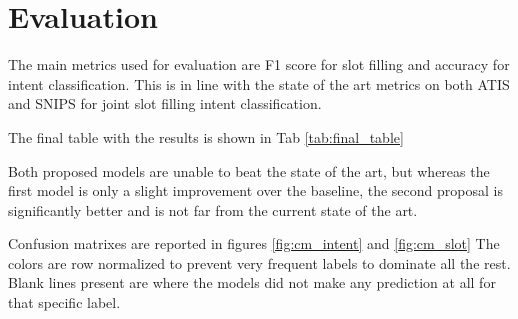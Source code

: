 \documentclass[a4paper]{article}
\begin{document}
\section{Evaluation}

The main metrics used for evaluation are F1 score for slot filling and accuracy for intent classification. This is in line with the state of the art metrics on both ATIS and SNIPS for joint slot filling intent classification.

The final table with the results is shown in Tab \ref{tab:final_table}

Both proposed models are unable to beat the state of the art, but whereas the first model is only a slight improvement over the baseline, the second proposal is significantly better and is not far from the current state of the art.

Confusion matrixes are reported in figures \ref{fig:cm_intent} and \ref{fig:cm_slot}
The colors are row normalized to prevent very frequent labels to dominate all the rest. 
Blank lines present are where the models did not make any prediction at all for that specific label.
\end{document}
